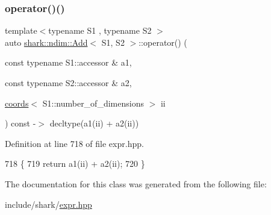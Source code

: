 \subsubsection{\texorpdfstring{operator()()}{operator()()}}
{\footnotesize\ttfamily template$<$typename S1 , typename S2 $>$ \\
auto \hyperlink{classshark_1_1ndim_1_1_add}{shark\+::ndim\+::\+Add}$<$ S1, S2 $>$\+::operator() (\begin{DoxyParamCaption}\item[{const typename S1\+::accessor \&}]{a1,  }\item[{const typename S2\+::accessor \&}]{a2,  }\item[{\hyperlink{structshark_1_1ndim_1_1coords}{coords}$<$ S1\+::number\+\_\+of\+\_\+dimensions $>$}]{ii }\end{DoxyParamCaption}) const -\/$>$ decltype(a1(ii) + a2(ii)) \hspace{0.3cm}{\ttfamily [inline]}}



Definition at line 718 of file expr.\+hpp.


\begin{DoxyCode}
718                                                                                                            
                                                           \{
719                 \textcolor{keywordflow}{return} a1(ii) + a2(ii);
720             \}
\end{DoxyCode}


The documentation for this class was generated from the following file\+:\begin{DoxyCompactItemize}
\item 
include/shark/\hyperlink{expr_8hpp}{expr.\+hpp}\end{DoxyCompactItemize}

